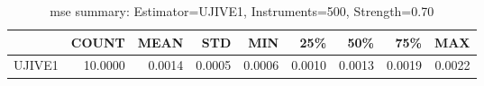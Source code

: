 \begin{table}[ht]
\centering
\caption{mse summary: Estimator=UJIVE1, Instruments=500, Strength=0.70}
\begin{tabular}{lrrrrrrrr}
\toprule
 & COUNT & MEAN & STD & MIN & 25\% & 50\% & 75\% & MAX \\
\midrule
UJIVE1 & 10.0000 & 0.0014 & 0.0005 & 0.0006 & 0.0010 & 0.0013 & 0.0019 & 0.0022 \\
\bottomrule
\end{tabular}
\end{table}
